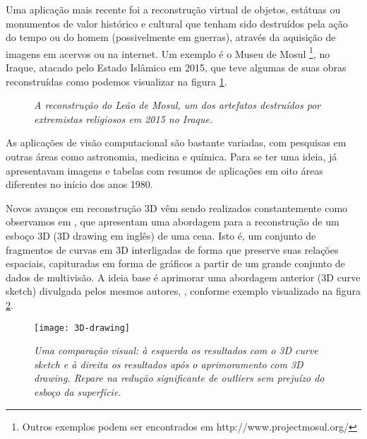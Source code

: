 Uma aplicação mais recente foi a reconstrução virtual de objetos, estátuas ou monumentos de valor histórico e cultural que tenham sido destruídos pela ação do tempo ou do homem (possivelmente em guerras), através da aquisição de imagens em acervos ou na internet. Um exemplo é o Museu de Mosul {\footnote{Outros exemplos podem ser encontrados em http://www.projectmosul.org/}}, no Iraque, atacado pelo 
Estado Islâmico em 2015, que teve algumas de suas obras reconstruídas como podemos visualizar na figura \ref{fig.mossul}.

\begin{figure}[!htb]
\centering
{}
\quad
{}
\caption{{\it A reconstrução do Leão de Mosul, um dos artefatos destruídos por extremistas religiosos em 2015 no Iraque.}}
\label{fig.mossul}
\end{figure}

As aplicações de visão computacional são bastante variadas, com pesquisas em outras áreas como astronomia, medicina e química. Para se ter uma ideia, \citep{ballard-82} já apresentavam imagens e tabelas com resumos de aplicações em oito áreas diferentes no início dos anos 1980.  

Novos avanços em reconstrução 3D vêm sendo realizados constantemente como observamos em \citep{fabbri-drawing}, que apresentam uma abordagem para a reconstrução de um esboço 3D (3D drawing em inglês) de uma cena. Isto é, um conjunto de fragmentos de curvas em 3D interligadas de forma que preserve suas relações espaciais, capituradas em forma de gráficos a partir de um grande conjunto de dados de multivisão. A ideia base é aprimorar uma abordagem anterior (3D curve sketch) divulgada pelos mesmos autores, \citep{fabbri-sketch}, conforme exemplo visualizado na figura \ref{fig.drawing}.
\begin{figure}[!htb]
\centering
\texttt{[image: 3D-drawing]}
\caption{{\it Uma comparação visual: à esquerda os resultados com o 3D curve sketch e à direita os resultados após o aprimoramento com 3D drawing. Repare na redução significante de outliers sem prejuízo do esboço da superfície.}}
\label{fig.drawing}
\end{figure}

